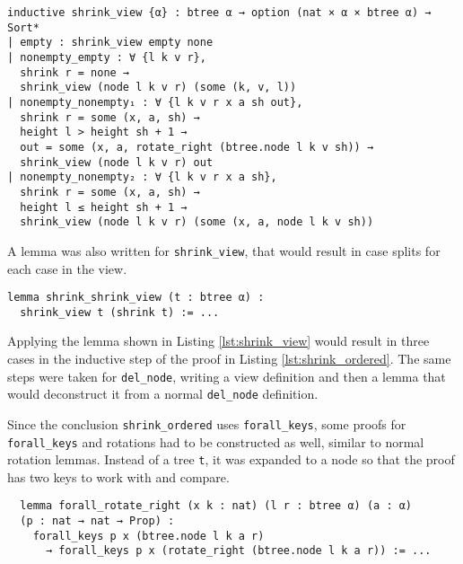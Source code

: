 \begin{lstlisting}[caption=\empty]
inductive shrink_view {α} : btree α → option (nat × α × btree α) → Sort*
| empty : shrink_view empty none
| nonempty_empty : ∀ {l k v r},
  shrink r = none →
  shrink_view (node l k v r) (some (k, v, l))
| nonempty_nonempty₁ : ∀ {l k v r x a sh out},
  shrink r = some (x, a, sh) →
  height l > height sh + 1 →
  out = some (x, a, rotate_right (btree.node l k v sh)) →
  shrink_view (node l k v r) out
| nonempty_nonempty₂ : ∀ {l k v r x a sh},
  shrink r = some (x, a, sh) →
  height l ≤ height sh + 1 →
  shrink_view (node l k v r) (some (x, a, node l k v sh))
\end{lstlisting}

A lemma was also written for \lstinline{shrink_view}, that would result in case splits for each case in the view. 

\begin{lstlisting}[caption=\empty, label={lst:shrink_view}]
lemma shrink_shrink_view (t : btree α) : 
  shrink_view t (shrink t) := ...
\end{lstlisting}

Applying the lemma shown in Listing \ref{lst:shrink_view} would result in three cases in the inductive step of the proof in Listing \ref{lst:shrink_ordered}. The same steps were taken for \lstinline{del_node}, writing a view definition and then a lemma that would deconstruct it from a normal \lstinline{del_node} definition.

Since the conclusion \lstinline{shrink_ordered} uses \lstinline{forall_keys}, some proofs for \lstinline{forall_keys} and rotations had to be constructed as well, similar to normal rotation lemmas. Instead of a tree \lstinline{t}, it was expanded to a node so that the proof has two keys to work with and compare.

\begin{lstlisting}
  lemma forall_rotate_right (x k : nat) (l r : btree α) (a : α) 
  (p : nat → nat → Prop) :
    forall_keys p x (btree.node l k a r) 
      → forall_keys p x (rotate_right (btree.node l k a r)) := ...
\end{lstlisting}